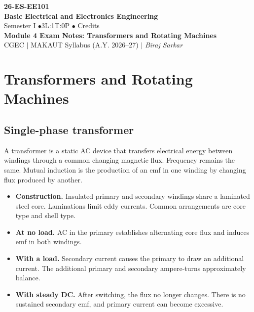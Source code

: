 \documentclass[12pt,a4paper]{article}
\begin{document}
\begin{center}
  {\Large\bfseries\color{myred} 26-ES-EE101}\\[3pt]
  {\LARGE\bfseries\color{myred} Basic Electrical and Electronics Engineering}\\[5pt]
  {\normalsize\color{mydark} Semester I \quad$\bullet$\quad 3L:1T:0P \quad$\bullet$ Credits}\\[3pt]
  {\normalsize\color{myteal}\textbf{Module 4 Exam Notes: Transformers and Rotating Machines}}\\[3pt]
  {\small\color{mydark} CGEC \;$|$\; MAKAUT Syllabus (A.Y. 2026--27) \;$|$\; \textit{Biraj Sarkar}}
\end{center}
\vspace{2pt}
\noindent{\color{myred}\rule{\linewidth}{1.5pt}}
\vspace{2pt}

\hypersetup{linkcolor=mydark}
\tableofcontents
\hypersetup{linkcolor=myteal}
\newpage

\section{Transformers and Rotating Machines}

\subsection{Single-phase transformer}
\begin{tcolorbox}[defbox,title={Transformer and mutual induction}]
A transformer is a static AC device that transfers electrical energy between windings through a common changing magnetic flux. Frequency remains the same. Mutual induction is the production of an emf in one winding by changing flux produced by another.
\end{tcolorbox}

\begin{itemize}[leftmargin=*, itemsep=3pt, topsep=4pt]
  \item \textbf{Construction.} Insulated primary and secondary windings share a laminated steel core. Laminations limit eddy currents. Common arrangements are core type and shell type.
  \item \textbf{At no load.} AC in the primary establishes alternating core flux and induces emf in both windings.
  \item \textbf{With a load.} Secondary current causes the primary to draw an additional current. The additional primary and secondary ampere-turns approximately balance.
  \item \textbf{With steady DC.} After switching, the flux no longer changes. There is no sustained secondary emf, and primary current can become excessive.
\end{itemize}
\end{document}
